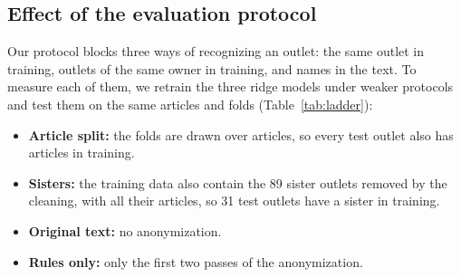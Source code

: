 \documentclass[11pt,a4paper]{article}
\begin{document}
\begin{table}[t]
\centering\small
\caption{Error on other populations. Each row is a check and each column a model; the cells give the MAE per outlet
and, in parentheses, the difference from TF-IDF in the same row (negative: better than TF-IDF). The re-weighted rows
weight the error of each NewsGuard level by its share among the political outlets we could not collect, or among all
the political outlets sent to the scraper (Appendix~\ref{app:robust}).}\label{tab:robust}
\end{table}

\subsection{Effect of the evaluation protocol}\label{sec:ladder}
Our protocol blocks three ways of recognizing an outlet: the same outlet in training, outlets of the same owner in
training, and names in the text. To measure each of them, we retrain the three ridge models under weaker protocols and
test them on the same articles and folds (Table~\ref{tab:ladder}):
\begin{itemize}
  \item \textbf{Article split:} the folds are drawn over articles, so every test outlet also has articles in training.
  \item \textbf{Sisters:} the training data also contain the 89 sister outlets removed by the cleaning, with all their
        articles, so 31 test outlets have a sister in training.
  \item \textbf{Original text:} no anonymization.
  \item \textbf{Rules only:} only the first two passes of the anonymization.
\end{itemize}
\end{document}
